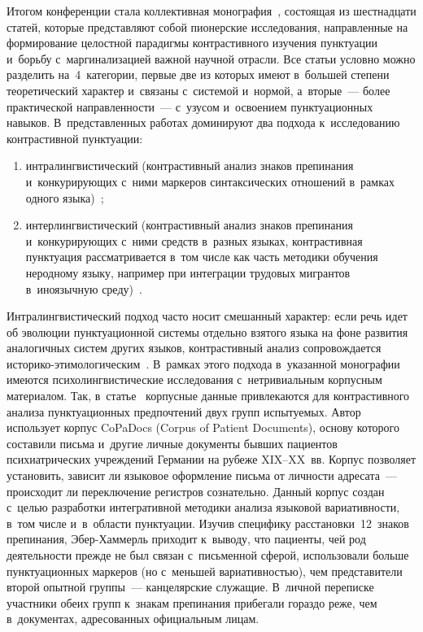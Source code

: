 \begin{multicols}{2}
  Итогом конференции стала коллективная монография~\cite{8-nu}, 
со\-сто\-ящая из шестнадцати статей, которые пред\-став\-ля\-ют собой пио\-нер\-ские 
исследования, на\-прав\-лен\-ные на формирование целостной па\-ра\-диг\-мы 
контрастивного изучения пунктуации и~борьбу с~маргинализацией важ\-ной 
научной от\-расли. Все статьи услов\-но мож\-но разделить на~4~категории, 
первые две из которых имеют в~большей степени тео\-ре\-ти\-че\-ский характер и~связаны с~сис\-те\-мой и~нормой, а~вторые~--- более практической 
на\-прав\-лен\-ности~--- с~узусом и~освоением пунктуационных навыков. 
В~пред\-став\-лен\-ных работах доминируют два подхода к~исследованию 
конт\-растив\-ной пунк\-ту\-ации:
  \begin{enumerate}[(1)]
\item интралингвистический (контрастивный анализ знаков препинания 
и~кон\-ку\-ри\-ру\-ющих с~ними маркеров синтаксических отношений в~рамках 
одного языка)~\cite[с.~110]{9-nu};
  \item  интерлингвистический (контрастивный анализ знаков препинания 
  и~конкурирующих с~ними средств в~разных языках, конт\-растив\-ная пунктуация 
рас\-смат\-ри\-ва\-ет\-ся в~том чис\-ле как часть методики обуче\-ния неродному языку, 
например при интеграции трудовых мигрантов в~иноязычную 
среду)~\cite[с.~57--73]{10-nu}.
  \end{enumerate}
  
  Интралингвистический подход час\-то носит смешанный характер: если 
речь идет об эволюции пунктуационной сис\-те\-мы отдельно взятого языка на 
фоне развития аналогичных сис\-тем других языков, контрастивный анализ 
со\-про\-вож\-да\-ет\-ся 
 ис\-то\-ри\-ко-эти\-мо\-ло\-ги\-че\-ским~\cite[с.~187--206]{11-nu}. В~рамках 
этого подхода в~указанной монографии имеются психолингвистические 
исследования с~нетривиальным корпусным материалом. Так, 
в~статье~\cite[с.~163--186]{12-nu} корпусные данные привлекаются для 
контрастивного анализа пунктуационных предпочтений двух групп 
ис\-пы\-ту\-емых. Автор использует корпус \mbox{CoPaDocs} (Corpus of Patient 
Documents), основу которого со\-ста\-ви\-ли письма и~другие личные документы 
бывших пациентов психиатрических учреж\-де\-ний Германии на рубеже  
XIX--XX~вв. Корпус поз\-во\-ля\-ет установить, зависит ли языковое оформление 
пись\-ма от лич\-ности адресата~--- происходит ли переключение ре\-гист\-ров 
сознательно. Данный корпус создан с~целью разработки интегративной 
методики анализа языковой ва\-риа\-тивн\-ости, в~том чис\-ле и~в~об\-ласти 
пунктуации. \mbox{Изучив} специфику расстановки~12~знаков препинания, 
Эбер-Хам\-мерль приходит к~выводу, что пациенты, чей род де\-я\-тель\-ности 
прежде не был связан с~письменной сферой, использовали больше 
пунктуационных маркеров (но с~меньшей ва\-риа\-тив\-ностью), чем 
представители второй опытной группы~--- канцелярские служащие. 
В~лич\-ной переписке участники обеих групп к~знакам препинания прибегали 
гораздо реже, чем в~документах, адресованных официальным лицам.
  

\end{multicols}
